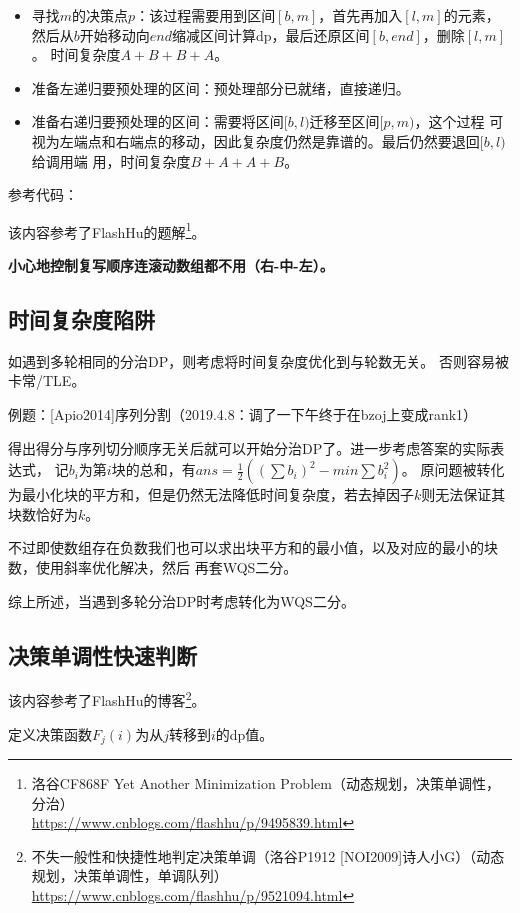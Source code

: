 \begin{itemize}
    \item 寻找$m$的决策点$p$：该过程需要用到区间$[b,m]$，首先再加入$[l,m]$的元素，
    然后从$b$开始移动向$end$缩减区间计算dp，最后还原区间$[b,end]$，删除$[l,m]$。
    时间复杂度$A+B+B+A$。
    \item 准备左递归要预处理的区间：预处理部分已就绪，直接递归。
    \item 准备右递归要预处理的区间：需要将区间$[b,l)$迁移至区间$[p,m)$，这个过程
    可视为左端点和右端点的移动，因此复杂度仍然是靠谱的。最后仍然要退回$[b,l)$给调用端
    用，时间复杂度$B+A+A+B$。
\end{itemize}

参考代码：


该内容参考了FlashHu的题解\footnote{
    洛谷CF868F Yet Another Minimization Problem（动态规划，决策单调性，分治）\\
    \url{https://www.cnblogs.com/flashhu/p/9495839.html}
}。

{\bfseries 小心地控制复写顺序连滚动数组都不用（右-中-左）。}

\subsection{时间复杂度陷阱}
如遇到多轮相同的分治DP，则考虑将时间复杂度优化到与轮数无关。
否则容易被卡常/TLE。

例题：[Apio2014]序列分割（2019.4.8：调了一下午终于在bzoj上变成rank1）

得出得分与序列切分顺序无关后就可以开始分治DP了。进一步考虑答案的实际表达式，
记$b_i$为第$i$块的总和，有$ans=\frac{1}{2}\left(\left(\sum{b_i}\right)^2-min\sum{b_i^2}\right)$。
原问题被转化为最小化块的平方和，但是仍然无法降低时间复杂度，若去掉因子$k$则无法保证其块数恰好为$k$。

不过即使数组存在负数我们也可以求出块平方和的最小值，以及对应的最小的块数，使用斜率优化解决，然后
再套WQS二分。

综上所述，当遇到多轮分治DP时考虑转化为WQS二分。
\subsection{决策单调性快速判断}
该内容参考了FlashHu的博客\footnote{
    不失一般性和快捷性地判定决策单调（洛谷P1912 [NOI2009]诗人小G）（动态规划，决策单调性，单调队列）\\
    \url{https://www.cnblogs.com/flashhu/p/9521094.html}
}。

定义决策函数$F_j(i)$为从$j$转移到$i$的dp值。

